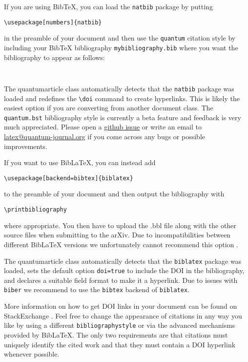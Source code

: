 \documentclass[a4paper,twocolumn,11pt,accepted=2017-05-09]{quantumarticle}
\begin{document}
If you are using BibTeX, you can load the \texttt{natbib} package by putting
\begin{verbatim}
\usepackage[numbers]{natbib}
\end{verbatim}
in the preamble of your document and then use the \texttt{quantum} citation style by including your BibTeX bibliography \texttt{mybibliography.bib} where you want the bibliography to appear as follows:
\begin{verbatim}


\end{verbatim}
The quantumarticle class automatically detects that the \texttt{natbib} package was loaded and redefines the \texttt{\textbackslash{}doi} command to create hyperlinks.
This is likely the easiest option if you are converting from another document class.
The \texttt{quantum.bst} bibliography style is currently a beta feature and feedback is very much appreciated. Please open a \href{https://github.com/quantum-journal/quantum-journal/issues}{github issue} or write an email to \href{mailto:latex@quantum-journal.org}{latex@quantum-journal.org} if you come across any bugs or possible improvements.

If you want to use BibLaTeX, you can instead add
\begin{verbatim}
\usepackage[backend=bibtex]{biblatex}

\end{verbatim}
to the preamble of your document and then output the bibliography with
\begin{verbatim}
\printbibliography
\end{verbatim}
where appropriate.
You then have to upload the .bbl file along with the other source files when submitting to the arXiv.
Due to incompatibilities between different BibLaTeX versions we unfortunately cannot recommend this option \cite{biblatexsubmittingtothearxiv}.

The quantumarticle class automatically detects that the \texttt{biblatex} package was loaded, sets the default option \texttt{doi=true} to include the DOI in the bibliography, and declares a suitable field format to make it a hyperlink.
Due to issues with \texttt{biber} we recommend to use the \texttt{bibtex} backend of \texttt{biblatex}.

More information on how to get DOI links in your document can be found on StackExchange \cite{howtogetdoilinksinbibliography,automaticallyaddingdoifieldstoahandmadebibliography}.
Feel free to change the appearance of citations in any way you like by using a different \texttt{bibliographystyle} or via the advanced mechanisms provided by BibLaTeX.
The only two requirements are that citations must uniquely identify the cited work and that they must contain a DOI hyperlink whenever possible.
\end{document}
